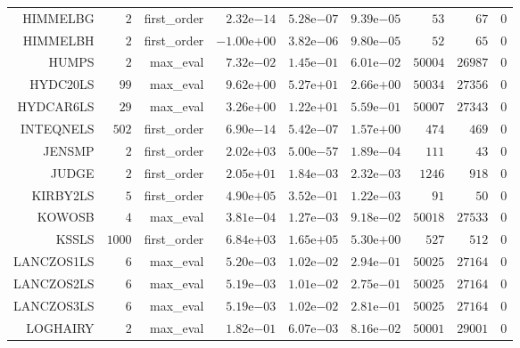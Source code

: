 \begin{longtable}{rrrrrrrrr}
HIMMELBG & \(     2\) & first\_order & \( 2.32\)e\(-14\) & \( 5.28\)e\(-07\) & \( 9.39\)e\(-05\) & \(    53\) & \(    67\) & \(     0\) \\
HIMMELBH & \(     2\) & first\_order & \(-1.00\)e\(+00\) & \( 3.82\)e\(-06\) & \( 9.80\)e\(-05\) & \(    52\) & \(    65\) & \(     0\) \\
HUMPS & \(     2\) & max\_eval & \( 7.32\)e\(-02\) & \( 1.45\)e\(-01\) & \( 6.01\)e\(-02\) & \( 50004\) & \( 26987\) & \(     0\) \\
HYDC20LS & \(    99\) & max\_eval & \( 9.62\)e\(+00\) & \( 5.27\)e\(+01\) & \( 2.66\)e\(+00\) & \( 50034\) & \( 27356\) & \(     0\) \\
HYDCAR6LS & \(    29\) & max\_eval & \( 3.26\)e\(+00\) & \( 1.22\)e\(+01\) & \( 5.59\)e\(-01\) & \( 50007\) & \( 27343\) & \(     0\) \\
INTEQNELS & \(   502\) & first\_order & \( 6.90\)e\(-14\) & \( 5.42\)e\(-07\) & \( 1.57\)e\(+00\) & \(   474\) & \(   469\) & \(     0\) \\
JENSMP & \(     2\) & first\_order & \( 2.02\)e\(+03\) & \( 5.00\)e\(-57\) & \( 1.89\)e\(-04\) & \(   111\) & \(    43\) & \(     0\) \\
JUDGE & \(     2\) & first\_order & \( 2.05\)e\(+01\) & \( 1.84\)e\(-03\) & \( 2.32\)e\(-03\) & \(  1246\) & \(   918\) & \(     0\) \\
KIRBY2LS & \(     5\) & first\_order & \( 4.90\)e\(+05\) & \( 3.52\)e\(-01\) & \( 1.22\)e\(-03\) & \(    91\) & \(    50\) & \(     0\) \\
KOWOSB & \(     4\) & max\_eval & \( 3.81\)e\(-04\) & \( 1.27\)e\(-03\) & \( 9.18\)e\(-02\) & \( 50018\) & \( 27533\) & \(     0\) \\
KSSLS & \(  1000\) & first\_order & \( 6.84\)e\(+03\) & \( 1.65\)e\(+05\) & \( 5.30\)e\(+00\) & \(   527\) & \(   512\) & \(     0\) \\
LANCZOS1LS & \(     6\) & max\_eval & \( 5.20\)e\(-03\) & \( 1.02\)e\(-02\) & \( 2.94\)e\(-01\) & \( 50025\) & \( 27164\) & \(     0\) \\
LANCZOS2LS & \(     6\) & max\_eval & \( 5.19\)e\(-03\) & \( 1.01\)e\(-02\) & \( 2.75\)e\(-01\) & \( 50025\) & \( 27164\) & \(     0\) \\
LANCZOS3LS & \(     6\) & max\_eval & \( 5.19\)e\(-03\) & \( 1.02\)e\(-02\) & \( 2.81\)e\(-01\) & \( 50025\) & \( 27164\) & \(     0\) \\
LOGHAIRY & \(     2\) & max\_eval & \( 1.82\)e\(-01\) & \( 6.07\)e\(-03\) & \( 8.16\)e\(-02\) & \( 50001\) & \( 29001\) & \(     0\) \\

\end{longtable}
